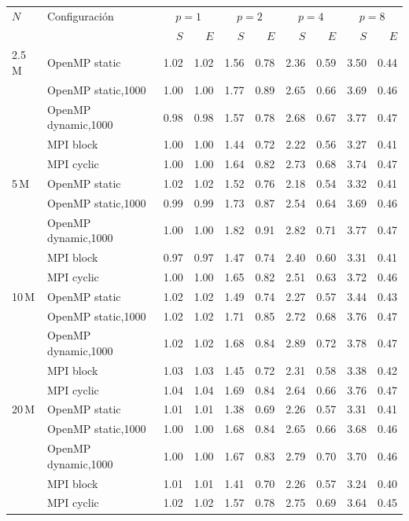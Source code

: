 \begin{tabular}{llrrrrrrrr}
\toprule
$N$ & Configuraci\'on & \multicolumn{2}{c}{$p=1$} & \multicolumn{2}{c}{$p=2$} & \multicolumn{2}{c}{$p=4$} & \multicolumn{2}{c}{$p=8$} \\
 & & $S$ & $E$ & $S$ & $E$ & $S$ & $E$ & $S$ & $E$ \\
\midrule
2.5\,M & OpenMP static & 1.02 & 1.02 & 1.56 & 0.78 & 2.36 & 0.59 & 3.50 & 0.44 \\
 & OpenMP static,1000 & 1.00 & 1.00 & 1.77 & 0.89 & 2.65 & 0.66 & 3.69 & 0.46 \\
 & OpenMP dynamic,1000 & 0.98 & 0.98 & 1.57 & 0.78 & 2.68 & 0.67 & 3.77 & 0.47 \\
 & MPI block & 1.00 & 1.00 & 1.44 & 0.72 & 2.22 & 0.56 & 3.27 & 0.41 \\
 & MPI cyclic & 1.00 & 1.00 & 1.64 & 0.82 & 2.73 & 0.68 & 3.74 & 0.47 \\
\midrule
5\,M & OpenMP static & 1.02 & 1.02 & 1.52 & 0.76 & 2.18 & 0.54 & 3.32 & 0.41 \\
 & OpenMP static,1000 & 0.99 & 0.99 & 1.73 & 0.87 & 2.54 & 0.64 & 3.69 & 0.46 \\
 & OpenMP dynamic,1000 & 1.00 & 1.00 & 1.82 & 0.91 & 2.82 & 0.71 & 3.77 & 0.47 \\
 & MPI block & 0.97 & 0.97 & 1.47 & 0.74 & 2.40 & 0.60 & 3.31 & 0.41 \\
 & MPI cyclic & 1.00 & 1.00 & 1.65 & 0.82 & 2.51 & 0.63 & 3.72 & 0.46 \\
\midrule
10\,M & OpenMP static & 1.02 & 1.02 & 1.49 & 0.74 & 2.27 & 0.57 & 3.44 & 0.43 \\
 & OpenMP static,1000 & 1.02 & 1.02 & 1.71 & 0.85 & 2.72 & 0.68 & 3.76 & 0.47 \\
 & OpenMP dynamic,1000 & 1.02 & 1.02 & 1.68 & 0.84 & 2.89 & 0.72 & 3.78 & 0.47 \\
 & MPI block & 1.03 & 1.03 & 1.45 & 0.72 & 2.31 & 0.58 & 3.38 & 0.42 \\
 & MPI cyclic & 1.04 & 1.04 & 1.69 & 0.84 & 2.64 & 0.66 & 3.76 & 0.47 \\
\midrule
20\,M & OpenMP static & 1.01 & 1.01 & 1.38 & 0.69 & 2.26 & 0.57 & 3.31 & 0.41 \\
 & OpenMP static,1000 & 1.00 & 1.00 & 1.68 & 0.84 & 2.65 & 0.66 & 3.68 & 0.46 \\
 & OpenMP dynamic,1000 & 1.00 & 1.00 & 1.67 & 0.83 & 2.79 & 0.70 & 3.70 & 0.46 \\
 & MPI block & 1.01 & 1.01 & 1.41 & 0.70 & 2.26 & 0.57 & 3.24 & 0.40 \\
 & MPI cyclic & 1.02 & 1.02 & 1.57 & 0.78 & 2.75 & 0.69 & 3.64 & 0.45 \\
\bottomrule
\end{tabular}